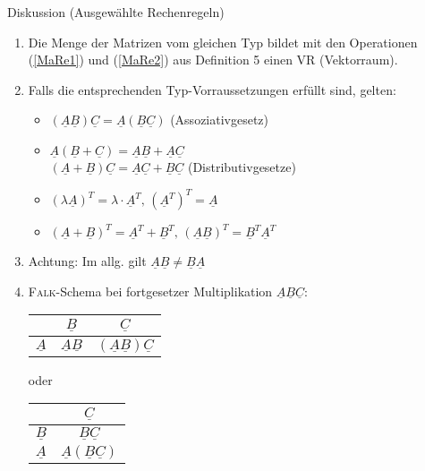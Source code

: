 \documentclass[a4paper]{scrartcl}
\begin{document}
Diskussion (Ausgewählte Rechenregeln)
\begin{enumerate}
\item Die Menge der Matrizen vom gleichen Typ bildet mit den Operationen (\ref{MaRe1}) und (\ref{MaRe2}) aus Definition 5 einen VR (Vektorraum).
\item Falls die entsprechenden Typ-Vorraussetzungen erfüllt sind, gelten:
\begin{itemize}
\item $(\underline{A} \underline{B} ) \underline{C} = \underline{A} (\underline{B} \underline{C})$ (Assoziativgesetz)
\item $\underline{A} (\underline{B} + \underline{C}) = \underline{A} \underline{B} + \underline{A} \underline{C}$\\
$(\underline{A} + \underline{B}) \underline{C} = \underline{A} \underline{C} + \underline{B} \underline{C}$ (Distributivgesetze)
\item $(\lambda \underline{A})^T = \lambda \cdot \underline{A}^T,\, (\underline{A}^T)^T = \underline{A}$
\item $(\underline{A} + \underline{B})^T = \underline{A}^T + \underline{B}^T, \, (\underline{A} \underline{B})^T = \underline{B}^T \underline{A}^T$ 
\end{itemize}
\item Achtung: Im allg. gilt $\underline{A} \underline{B} \neq \underline{B} \underline{A}$
\item \textsc{Falk}-Schema bei fortgesetzer Multiplikation $\underline{A} \underline{B} \underline{C}$:\\
\begin{tabular}{c|c|c}
 & $\underline{B}$ & $\underline{C}$\\ \hline
$\underline{A}$ & $\underline{A} \underline{B}$ & $(\underline{A} \underline{B}) \underline{C}$
\end{tabular} oder
\begin{tabular}{c|c}
 & $\underline{C}$\\ \hline
$\underline{B}$ & $\underline{B} \underline{C}$\\ \hline
$\underline{A}$ & $\underline{A} (\underline{B} \underline{C})$
\end{tabular}
\end{enumerate}
\end{document}
